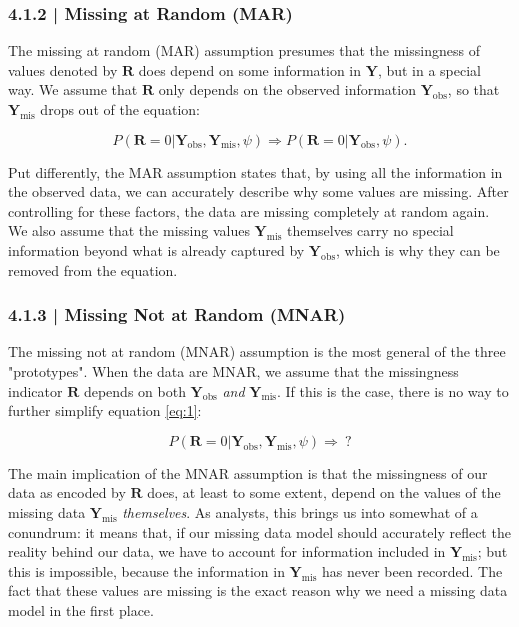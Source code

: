 \subsubsection{{\normalfont\textsf{\textcolor{sBlue}{\small 4.1.2 |}}} Missing at Random (MAR)}

The missing at random (MAR) assumption presumes that the missingness of values denoted by $\mathbf{R}$ does depend on some information in $\mathbf{Y}$, but in a special way. We assume that $\mathbf{R}$ only depends on the observed information $\mathbf{Y}_{\text{obs}}$, so that $\mathbf{Y}_{\text{mis}}$ drops out of the equation:

\begin{equation}
P(\mathbf{R}=0|\mathbf{Y}_{\text{obs}}, \mathbf{Y}_{\text{mis}}, \psi) \Rightarrow P(\mathbf{R}=0|\mathbf{Y}_{\text{obs}}, \psi).
\end{equation}

Put differently, the MAR assumption states that, by using all the information in the observed data, we can accurately describe why some values are missing. After controlling for these factors, the data are missing completely at random again. We also assume that the missing values $\mathbf{Y}_{\text{mis}}$ themselves carry no special information beyond what is already captured by $\mathbf{Y}_{\text{obs}}$, which is why they can be removed from the equation. 

\subsubsection{{\normalfont\textsf{\textcolor{sBlue}{\small 4.1.3 |}}} Missing Not at Random (MNAR)}

The missing not at random (MNAR) assumption is the most general of the three "prototypes". When the data are MNAR, we assume that the missingness indicator $\mathbf{R}$ depends on both $\mathbf{Y}_{\text{obs}}$ \emph{and} $\mathbf{Y}_{\text{mis}}$. If this is the case, there is no way to further simplify equation \ref{eq:1}:

\begin{equation}
P(\mathbf{R}=0|\mathbf{Y}_{\text{obs}}, \mathbf{Y}_{\text{mis}}, \psi) \Rightarrow~?
\end{equation}

The main implication of the MNAR assumption is that the missingness of our data as encoded by $\mathbf{R}$ does, at least to some extent, depend on the values of the missing data $\mathbf{Y}_{\text{mis}}$ \emph{themselves}. As analysts, this brings us into somewhat of a conundrum: it means that, if our missing data model should accurately reflect the reality behind our data, we have to account for information included in $\mathbf{Y}_{\text{mis}}$; but this is impossible, because the information in $\mathbf{Y}_{\text{mis}}$ has never been recorded. The fact that these values are missing is the exact reason why we need a missing data model in the first place. 

